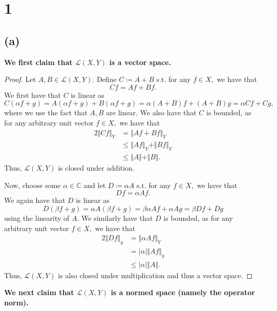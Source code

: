 \documentclass[10pt]{article}
\begin{document}
\section*{1}
\subsection*{(a)}

\textbf{We first claim that $\mathscr{L}(X,Y)$ is a vector space.}

\begin{proof}
    Let $A,B\in\mathscr{L}(X,Y).$ Define $C \coloneqq A+B$ s.t. for any $f\in X,$ we have that
    \[Cf = Af + Bf.\]
    We first have that $C$ is linear as
    \[C(\alpha f + g) = A(\alpha f + g) + B(\alpha f + g) = \alpha(A+B)f + (A+B)g=\alpha Cf + Cg,\]
    where we use the fact that $A,B$ are linear. We also have that $C$ is bounded, as for any arbitrary unit vector $f\in X,$ we have that
    \begin{alignat*}{2}
        \Vert Cf\Vert_Y &= \Vert Af + Bf\Vert_Y\\
        &\le \Vert Af\Vert_Y + \Vert Bf\Vert_Y\\
        &\le \Vert A\Vert + \Vert B\Vert.
    \end{alignat*}
    Thus, $\mathscr{L}(X,Y)$ is closed under addition.

    Now, choose some $\alpha\in\mathbb{C}$ and let $D\coloneqq \alpha A$ s.t. for any $f\in X,$ we have that
    \[Df = \alpha Af.\]
    We again have that $D$ is linear as
    \[D(\beta f+g) = \alpha A(\beta f+g) = \beta\alpha Af + \alpha Ag=\beta Df + Dg\]
    using the linearity of $A.$ We similarly have that $D$ is bounded, as for any arbitrary unit vector $f\in X,$ we have that
    \begin{alignat*}{2}
        \Vert Df\Vert_y &= \Vert \alpha Af\Vert_Y\\
        &= |\alpha| \Vert Af\Vert_y\\
        &\le |\alpha| \Vert A\Vert.
    \end{alignat*}
    Thus, $\mathscr{L}(X,Y)$ is also closed under multiplication and thus a vector space.
\end{proof}

\noindent
\textbf{We next claim that $\mathscr{L}(X,Y)$ is a normed space (namely the operator norm).}
\end{document}
